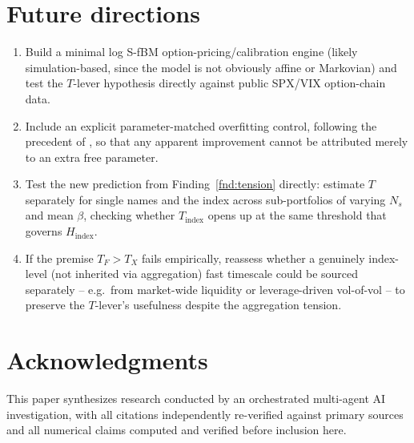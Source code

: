 \documentclass[11pt]{article}
\begin{document}
\section{Future directions}

\begin{enumerate}
\item Build a minimal log S-fBM option-pricing/calibration engine (likely simulation-based, since the model is not obviously affine or Markovian) and test the $T$-lever hypothesis directly against public SPX/VIX option-chain data.
\item Include an explicit parameter-matched overfitting control, following the precedent of \citet{abijaberilland2025joint}, so that any apparent improvement cannot be attributed merely to an extra free parameter.
\item Test the new prediction from Finding~\ref{fnd:tension} directly: estimate $T$ separately for single names and the index across sub-portfolios of varying $N_s$ and mean $\beta$, checking whether $T_{\text{index}}$ opens up at the same threshold that governs $H_{\text{index}}$.
\item If the premise $T_F>T_X$ fails empirically, reassess whether a genuinely index-level (not inherited via aggregation) fast timescale could be sourced separately -- e.g.\ from market-wide liquidity or leverage-driven vol-of-vol -- to preserve the $T$-lever's usefulness despite the aggregation tension.
\end{enumerate}

\section*{Acknowledgments}
This paper synthesizes research conducted by an orchestrated multi-agent AI investigation, with all citations independently re-verified against primary sources and all numerical claims computed and verified before inclusion here.
\end{document}
